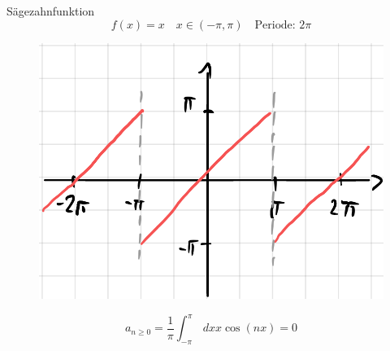 	\begin{Bsp}{Sägezahnfunktion}
		$$f(x)=x \quad x \in (-\pi,\pi) \quad \textrm{Periode: } 2\pi$$
		\begin{figure}[H]
			\centering
			\includegraphics[width=0.4\linewidth]{Grafiken/2_Fourierreihen/Grafik3.PNG}
		\end{figure}

		$$a_{n \geq 0} = \frac{1}{\pi} \int_{-\pi}^{\pi} \,dx x \cos(nx) = 0$$

	\end{Bsp}